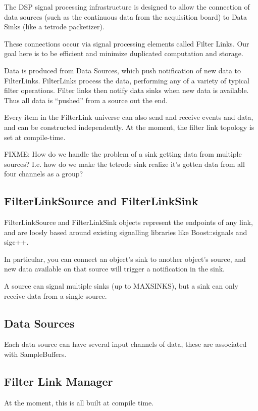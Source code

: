 The DSP signal processing infrastructure is designed to allow the
connection of data sources (such as the continuous data from the
acquisition board) to Data Sinks (like a tetrode packetizer).

These connections occur via signal processing elements called Filter
Links. Our goal here is to be efficient and minimize duplicated
computation and storage. 

Data is produced from Data Sources, which push notification of new
data to FilterLinks. FilterLinks process the data, performing any of a
variety of typical filter operations. Filter links then notify data
sinks when new data is available. Thus all data is ``pushed'' from a
source out the end.

Every item in the FilterLink universe can also send and receive
events and data, and can be constructed independently. At the moment, 
the filter link topology is set at compile-time. 

FIXME: How do we handle the problem of a sink getting data from
multiple sources? I.e. how do we make the tetrode sink realize 
it's gotten data from all four channels as a group? 

\subsection{FilterLinkSource and FilterLinkSink}
FilterLinkSource and FilterLinkSink objects represent
the endpoints of any link, and are loosly based around
existing signalling libraries like Boost::signals and sigc++. 

In particular, you can connect an object's sink to another object's
source, and new data available on that source will trigger
a notification in the sink. 

A source can signal multiple sinks (up to MAXSINKS), but
a sink can only receive data from a single source. 


\subsection{Data Sources}
Each data source can have several input channels of data, these are
associated with SampleBuffers. 


\subsection{Filter Link Manager}
At the moment, this is all built at compile time. 

